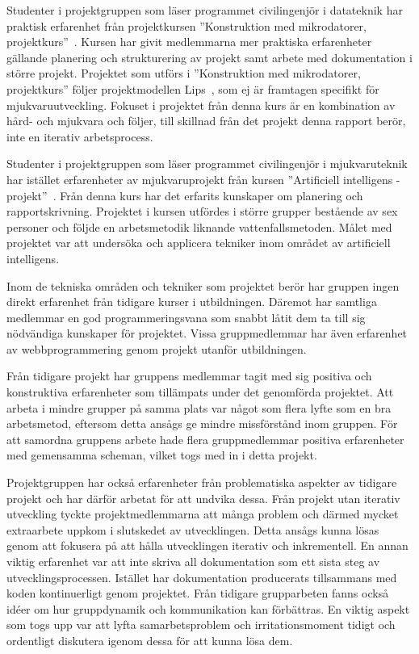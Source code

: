 Studenter i projektgruppen som läser programmet civilingenjör i datateknik har praktisk erfarenhet från projektkursen ''Konstruktion med mikrodatorer, projektkurs''~\cite{tsea29}. Kursen har givit medlemmarna mer praktiska erfarenheter gällande planering och strukturering av projekt samt arbete med dokumentation i större projekt. Projektet som utförs i ''Konstruktion med mikrodatorer, projektkurs'' följer projektmodellen Lips~\cite{lips}, som ej är framtagen specifikt för mjukvaruutveckling. Fokuset i projektet från denna kurs är en kombination av hård- och mjukvara och följer, till skillnad från det projekt denna rapport berör, inte en iterativ arbetsprocess.

Studenter i projektgruppen som läser programmet civilingenjör i mjukvaruteknik har istället erfarenheter av mjukvaruprojekt från kursen ''Artificiell intelligens - projekt''~\cite{tddd92}. Från denna kurs har det erfarits kunskaper om planering och rapportskrivning. Projektet i kursen utfördes i större grupper bestående av sex personer och följde en arbetsmetodik liknande vattenfallsmetoden. Målet med projektet var att undersöka och applicera tekniker inom området av artificiell intelligens.

Inom de tekniska områden och tekniker som projektet berör har gruppen ingen direkt erfarenhet från tidigare kurser i utbildningen. Däremot har samtliga medlemmar en god programmeringsvana som snabbt låtit dem ta till sig nödvändiga kunskaper för projektet. Vissa gruppmedlemmar har även erfarenhet av webbprogrammering genom projekt utanför utbildningen.

Från tidigare projekt har gruppens medlemmar tagit med sig positiva och konstruktiva erfarenheter som tillämpats under det genomförda projektet. Att arbeta i mindre grupper på samma plats var något som flera lyfte som en bra arbetsmetod, eftersom detta ansågs ge mindre missförstånd inom gruppen. För att samordna gruppens arbete hade flera gruppmedlemmar positiva erfarenheter med gemensamma scheman, vilket togs med in i detta projekt.

Projektgruppen har också erfarenheter från problematiska aspekter av tidigare projekt och har därför arbetat för att undvika dessa. Från projekt utan iterativ utveckling tyckte projektmedlemmarna att många problem och därmed mycket extraarbete uppkom i slutskedet av utvecklingen. Detta ansågs kunna lösas genom att fokusera på att hålla utvecklingen iterativ och inkrementell. En annan viktig erfarenhet var att inte skriva all dokumentation som ett sista steg av utvecklingsprocessen. Istället har dokumentation producerats tillsammans med koden kontinuerligt genom projektet. Från tidigare grupparbeten fanns också idéer om hur gruppdynamik och kommunikation kan förbättras. En viktig aspekt som togs upp var att lyfta samarbetsproblem och irritationsmoment tidigt och ordentligt diskutera igenom dessa för att kunna lösa dem.
